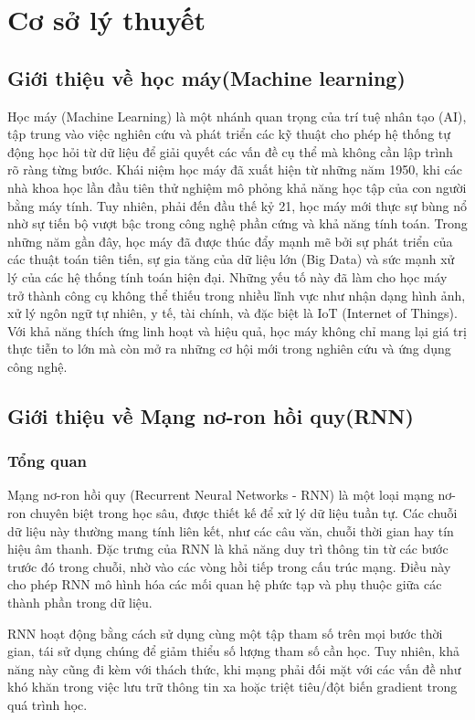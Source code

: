 \section{Cơ sở lý thuyết}
\subsection{Giới thiệu về học máy(Machine learning)}
\indent Học máy (Machine Learning) là một nhánh quan trọng của trí tuệ nhân tạo (AI), tập trung vào việc nghiên cứu và phát triển các kỹ thuật cho phép hệ thống tự động học hỏi từ dữ liệu để giải quyết các vấn đề cụ thể mà không cần lập trình rõ ràng từng bước. Khái niệm học máy đã xuất hiện từ những năm 1950, khi các nhà khoa học lần đầu tiên thử nghiệm mô phỏng khả năng học tập của con người bằng máy tính. Tuy nhiên, phải đến đầu thế kỷ 21, học máy mới thực sự bùng nổ nhờ sự tiến bộ vượt bậc trong công nghệ phần cứng và khả năng tính toán.
\indent Trong những năm gần đây, học máy đã được thúc đẩy mạnh mẽ bởi sự phát triển của các thuật toán tiên tiến, sự gia tăng của dữ liệu lớn (Big Data) và sức mạnh xử lý của các hệ thống tính toán hiện đại. Những yếu tố này đã làm cho học máy trở thành công cụ không thể thiếu trong nhiều lĩnh vực như nhận dạng hình ảnh, xử lý ngôn ngữ tự nhiên, y tế, tài chính, và đặc biệt là IoT (Internet of Things). Với khả năng thích ứng linh hoạt và hiệu quả, học máy không chỉ mang lại giá trị thực tiễn to lớn mà còn mở ra những cơ hội mới trong nghiên cứu và ứng dụng công nghệ.

\subsection{Giới thiệu về Mạng nơ-ron hồi quy(RNN)}
\subsubsection{Tổng quan}
\indent Mạng nơ-ron hồi quy (Recurrent Neural Networks - RNN) là một loại mạng nơ-ron chuyên biệt trong học sâu, được thiết kế để xử lý dữ liệu tuần tự. Các chuỗi dữ liệu này thường mang tính liên kết, như các câu văn, chuỗi thời gian hay tín hiệu âm thanh. Đặc trưng của RNN là khả năng duy trì thông tin từ các bước trước đó trong chuỗi, nhờ vào các vòng hồi tiếp trong cấu trúc mạng. Điều này cho phép RNN mô hình hóa các mối quan hệ phức tạp và phụ thuộc giữa các thành phần trong dữ liệu.

\indent RNN hoạt động bằng cách sử dụng cùng một tập tham số trên mọi bước thời gian, tái sử dụng chúng để giảm thiểu số lượng tham số cần học. Tuy nhiên, khả năng này cũng đi kèm với thách thức, khi mạng phải đối mặt với các vấn đề như khó khăn trong việc lưu trữ thông tin xa hoặc triệt tiêu/đột biến gradient trong quá trình học.

